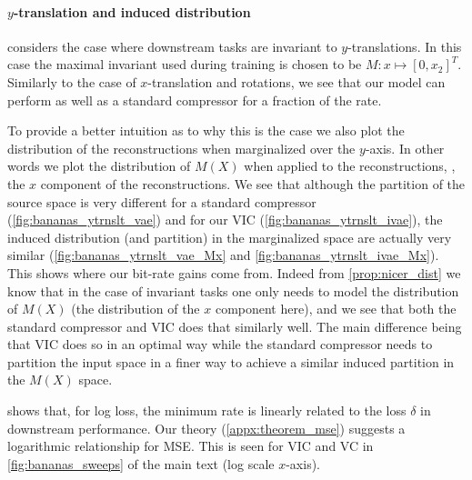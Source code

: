 \documentclass[final]{article}
\begin{document}
\paragraph{$y$-translation and induced distribution}
 considers the case where downstream tasks are invariant to $y$-translations.
In this case the maximal invariant used during training is chosen to be $M : x \mapsto [0,x_2]^T$.
Similarly to the case of $x$-translation and rotations, we see that our model can perform as well as a standard compressor for a fraction of the rate.

To provide a better intuition as to why this is the case we also plot the distribution of the reconstructions when marginalized over the $y$-axis.
In other words we plot the distribution of $M(X)$ when applied to the reconstructions, \ie, the $x$ component of the reconstructions.
We see that although the partition of the source space is very different for a standard compressor (\cref{fig:bananas_ytrnslt_vae}) and for our VIC (\cref{fig:bananas_ytrnslt_ivae}), the induced distribution (and partition) in the marginalized space are actually very similar (\cref{fig:bananas_ytrnslt_vae_Mx} and \cref{fig:bananas_ytrnslt_ivae_Mx}).
This shows where our bit-rate gains come from. 
Indeed from \cref{prop:nicer_dist} we know that in the case of invariant tasks one only needs to model the distribution of $M(X)$ (\eg the distribution of the $x$ component here), and we see that both the standard compressor and VIC does that similarly well.
The main difference being that VIC does so in an optimal way while the standard compressor needs to partition the input space in a finer way to achieve a similar induced partition in the $M(X)$ space.




















 shows that, for log loss, the minimum rate is linearly related to the loss $\delta$ in downstream performance.
Our theory (\cref{appx:theorem_mse}) suggests a logarithmic relationship for MSE.
This is seen for VIC and VC in \cref{fig:bananas_sweeps} of the main text (log scale $x$-axis).
\end{document}
